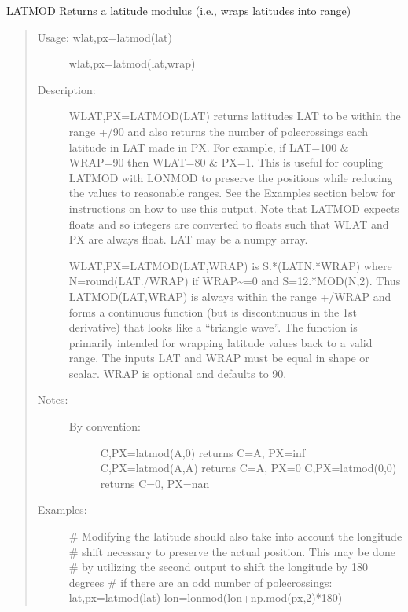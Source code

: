 \documentclass[letterpaper,10pt,english]{sphinxmanual}
\begin{document}
\begin{fulllineitems}
\label{\detokenize{infrapy.utils:infrapy.utils.latlon.latmod}}
LATMOD    Returns a latitude modulus (i.e., wraps latitudes into range)
\begin{quote}
\begin{description}
\item[{Usage:    wlat,px=latmod(lat)}] \leavevmode
wlat,px=latmod(lat,wrap)

\item[{Description:}] \leavevmode
WLAT,PX=LATMOD(LAT) returns latitudes LAT to be within the range +/\sphinxhyphen{}90
and  also returns the number of pole\sphinxhyphen{}crossings each latitude in LAT
made in PX.  For example, if LAT=100 \& WRAP=90 then WLAT=80 \& PX=1.
This is useful for coupling LATMOD with LONMOD to preserve the
positions while reducing the values to reasonable ranges.  See the
Examples section below for instructions on how to use this output.
Note that LATMOD expects floats and so integers are converted to
floats such that WLAT and PX are always float.  LAT may be a numpy
array.

WLAT,PX=LATMOD(LAT,WRAP) is S.*(LAT\sphinxhyphen{}N.*WRAP) where N=round(LAT./WRAP)
if WRAP\textasciitilde{}=0 and S=1\sphinxhyphen{}2.*MOD(N,2).  Thus LATMOD(LAT,WRAP) is always
within the range +/\sphinxhyphen{}WRAP and forms a continuous function (but is
discontinuous in the 1st derivative) that looks like a “triangle wave”.
The function is primarily intended for wrapping latitude values back
to a valid range.  The inputs LAT and WRAP must be equal in shape or
scalar.  WRAP is optional and defaults to 90.

\item[{Notes:}] \leavevmode\begin{description}
\item[{By convention:}] \leavevmode
C,PX=latmod(A,0) returns C=A, PX=inf
C,PX=latmod(A,A) returns C=A, PX=0
C,PX=latmod(0,0) returns C=0, PX=nan

\end{description}

\item[{Examples:}] \leavevmode
\# Modifying the latitude should also take into account the longitude
\# shift necessary to preserve the actual position.  This may be done
\# by utilizing the second output to shift the longitude by 180 degrees
\# if there are an odd number of pole\sphinxhyphen{}crossings:
lat,px=latmod(lat)
lon=lonmod(lon+np.mod(px,2)*180)


\end{description}
\end{quote}
\end{fulllineitems}
\end{document}
